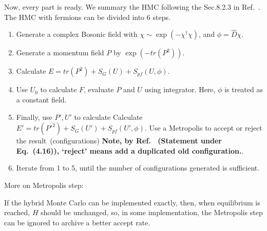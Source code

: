 Now, every part is ready. We summary the HMC following the Sec.8.2.3 in Ref.~\cite{latticeqcdbook2010}. The HMC with fermions can be divided into 6 steps.

\begin{enumerate}
  \item Generate a complex Bosonic field with $\chi \sim \exp (-\chi ^{\dagger}\chi)$, and $\phi = \hat{D} \chi$.
  \item Generate a momentum field $P$ by $\exp (-tr(P^2))$.
  \item Calculate $E=tr(P^2)+S_G(U)+S_{pf}(U,\phi)$.
  \item Use $U_0$ to calculate $F$, evaluate $P$ and $U$ using integrator. Here, $\phi$ is treated as a constant field.
  \item Finally, use $P',U'$ to calculate Calculate $E'=tr({P'}^2)+S_G(U')+S_{pf}(U',\phi)$. Use a Metropolis to accept or reject the result~(configurations) \textbf{Note, by Ref.~\cite{latticeqcdbook2010} (Statement under Eq.~(4.16)), `reject' means add a duplicated old configuration.}.
  \item Iterate from 1 to 5, until the number of configurations generated is sufficient.
\end{enumerate}


More on Metropolis step:

If the hybrid Monte Carlo can be implemented exactly, then, when equilibrium is reached, $H$ should be unchanged, so, in some implementation, the Metropolis step can be ignored to archive a better accept rate.

